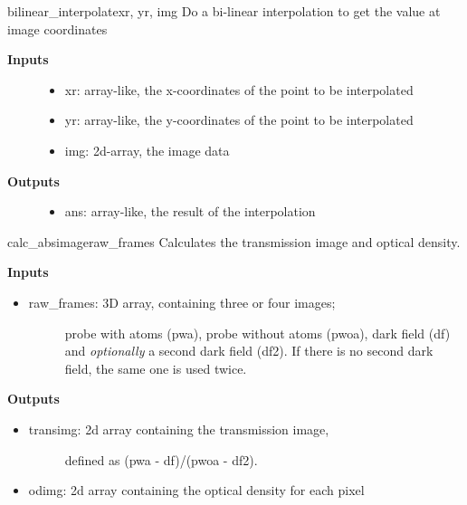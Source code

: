 \documentclass[letterpaper,10pt,english]{manual}
\begin{document}
\hypertarget{imageprocess.bilinear_interpolate}{}\begin{funcdesc}{bilinear\_interpolate}{xr, yr, img}
Do a bi-linear interpolation to get the value at image coordinates
\begin{description}
\item[\textbf{Inputs}]\begin{itemize}
\item {} 
xr: array-like, the x-coordinates of the point to be interpolated

\item {} 
yr: array-like, the y-coordinates of the point to be interpolated

\item {} 
img: 2d-array, the image data

\end{itemize}

\item[\textbf{Outputs}]\begin{itemize}
\item {} 
ans: array-like, the result of the interpolation

\end{itemize}

\end{description}
\end{funcdesc}

\hypertarget{imageprocess.calc_absimage}{}\begin{funcdesc}{calc\_absimage}{raw\_frames}
Calculates the transmission image and optical density.

\textbf{Inputs}
\begin{itemize}
\item {} \begin{description}
\item[raw\_frames: 3D array, containing three or four images;]
probe with atoms (pwa), probe without atoms (pwoa),
dark field (df) and \emph{optionally} a second dark field (df2).
If there is no second dark field, the same one is used
twice.

\end{description}

\end{itemize}

\textbf{Outputs}
\begin{itemize}
\item {} \begin{description}
\item[transimg: 2d array containing the transmission image,]
defined as (pwa - df)/(pwoa - df2).

\end{description}

\item {} 
odimg: 2d array containing the optical density for each pixel

\end{itemize}
\end{funcdesc}
\end{document}
